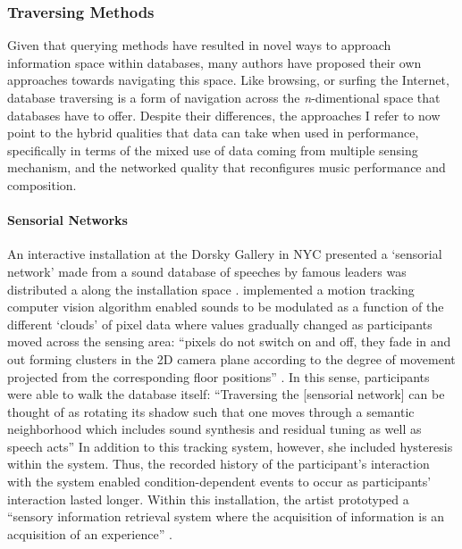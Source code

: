 \subsubsection{Traversing Methods}
{
	Given that querying methods have resulted in novel ways to approach information space within databases, many authors have proposed their own approaches towards navigating this space. Like browsing, or surfing the Internet, database traversing is a form of navigation across the \textit{n}-dimentional space that databases have to offer. Despite their differences, the approaches I refer to now point to the hybrid qualities that data can take when used in performance, specifically in terms of the mixed use of data coming from multiple sensing mechanism, and the networked quality that reconfigures music performance and composition.

	\paragraph{Sensorial Networks}
	An interactive installation at the Dorsky Gallery in NYC presented a `sensorial network' made from a sound database of speeches by famous leaders was distributed a along the installation space \parencite{Cho00:Voi, icmc/bbp2372.2000.146}. \citeauthor{icmc/bbp2372.2000.146} implemented a motion tracking computer vision algorithm enabled sounds to be modulated as a function of the different `clouds' of pixel data where values gradually changed as participants moved across the sensing area: ``pixels do not switch on and off, they fade in and out forming clusters in the 2D camera plane according to the degree of movement projected from the corresponding floor positions'' \parencite[4]{icmc/bbp2372.2000.146}. In this sense, participants were able to walk the database itself: ``Traversing the [sensorial network] can be thought of as rotating its shadow such that one moves through a semantic neighborhood which includes sound synthesis and residual tuning as well as speech acts'' \parencite[3]{icmc/bbp2372.2000.146}	In addition to this tracking system, however, she included hysteresis within the system. Thus, the recorded history of the participant's interaction with the system enabled condition-dependent events to occur as participants' interaction lasted longer. Within this installation, the artist prototyped a ``sensory information retrieval system where the acquisition of information is an acquisition of an experience'' \parencite[1]{icmc/bbp2372.2000.146}.

}
